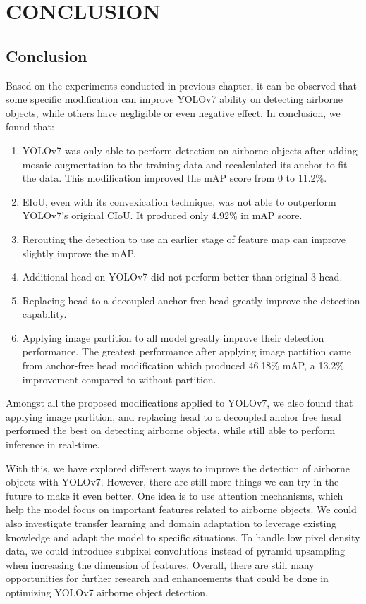 \chapter{CONCLUSION}


\section{Conclusion}
\label{section:conclusion}

Based on the experiments conducted in previous chapter, it can be observed that some specific modification
can improve YOLOv7 ability on detecting airborne objects, while others have negligible or even negative effect.
In conclusion, we found that:
\begin{enumerate}[noitemsep,topsep=0pt]
  \item YOLOv7 was only able to perform detection on airborne objects after adding mosaic augmentation to the training data and recalculated its anchor to fit the data.
  This modification improved the mAP score from 0 to 11.2\%.
  \item EIoU, even with its convexication technique, was not able to outperform YOLOv7's original CIoU. It produced only 4.92\% in mAP score.
  \item Rerouting the detection to use an earlier stage of feature map can improve slightly improve the mAP.
  \item Additional head on YOLOv7 did not perform better than original 3 head.
  \item Replacing head to a decoupled anchor free head greatly improve the detection capability.
  \item Applying image partition to all model greatly improve their detection performance. The greatest performance after applying image partition
  came from anchor-free head modification which produced 46.18\% mAP, a 13.2\% improvement compared to without partition.
\end{enumerate}
Amongst all the proposed modifications applied to YOLOv7, we also found that applying image partition, and replacing
head to a decoupled anchor free head performed the best on detecting airborne objects, while still able to perform inference in real-time.


With this, we have explored different ways to improve the detection of airborne objects with YOLOv7.
However, there are still more things we can try in the future to make it even better.
One idea is to use attention mechanisms, which help the model focus on important features related to airborne objects.
We could also investigate transfer learning and domain adaptation to leverage existing knowledge and adapt the model to specific situations.
To handle low pixel density data, we could introduce subpixel convolutions instead of pyramid upsampling when increasing the dimension of features.
Overall, there are still many opportunities for further research and enhancements that could be done in optimizing YOLOv7 airborne object detection.

